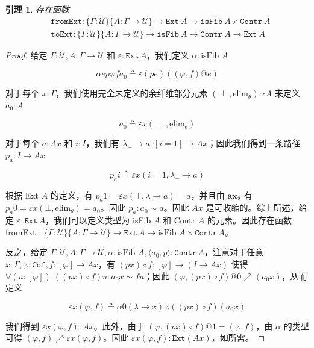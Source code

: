\documentclass{ctexart}
\theoremstyle{plain}
\newtheorem{lemma}[theorem]{引理}
\theoremstyle{definition}
\theoremstyle{definition}
\theoremstyle{definition}
\theoremstyle{definition}
\newcommand{\ax}[1]{\mathbf{ax_{#1}}}
\numberwithin{equation}{section}
\begin{document}
\begin{lemma}
存在函数
\begin{align}
&\mathtt{fromExt} : \{\Gamma : \mathcal{U}\}\{A : \Gamma \to \mathcal{U}\} \to \mathtt{Ext}\ A \to \mathtt{isFib}\ A \times \mathtt{Contr}\ A \\
&\mathtt{toExt} : \{\Gamma : \mathcal{U}\}\{A : \Gamma \to \mathcal{U}\} \to \mathtt{isFib}\ A \to \mathtt{Contr}\ A \to \mathtt{Ext}\ A
\end{align}
\end{lemma}

\begin{proof}
  给定 $ \Gamma : \mathcal{U}, A : \Gamma \to \mathcal{U} $ 和 $ \varepsilon : \mathtt{Ext}\,A $，我们定义 $ \alpha : \text{isFib } A $

\[ \alpha e p \varphi f a_0 \triangleq \varepsilon (p \bar{e}) ((\varphi, f) @ \bar{e}) \]

对于每个 $ x : \Gamma $，我们使用完全未定义的余纤维部分元素 $ (\perp, \text{elim}_\theta) : \square A $ 来定义 $ a_0 : A $

\[ a_0 \triangleq \varepsilon x (\perp, \text{elim}_\theta) \]

对于每个 $ a : A x $ 和 $ i : I $，我们有 $ \lambda_- \to a : [i = 1] \to A x $；因此我们得到一条路径 $ p_a : I \to A x $

\[ p_a i \triangleq \varepsilon x (i = 1, \lambda_- \to a) \]

根据 Ext $ A $ 的定义，有 $ p_a 1 = \varepsilon x(\top, \lambda \to a) = a $，并且由 $ \ax{2} $ 有 $ p_a 0 = \varepsilon x(\bot, \text{elim}_\theta) = a_0 $。因此 $ p_a : a_0 \sim a $。因此 $ A x $ 是可收缩的。综上所述，给定 $ \varepsilon : \mathtt{Ext}\,A $，我们可以定义类型为 isFib $ A $ 和 Contr $ A $ 的元素。因此存在函数 fromExt : $\{\Gamma : \mathcal{U}\} \{A : \Gamma \to \mathcal{U}\} \to \mathtt{Ext}\,A \to \text{isFib } A \times \mathtt{Contr}\,A$。

反之，给定 $ \Gamma : \mathcal{U}, A : \Gamma \to \mathcal{U}, \alpha : \text{isFib } A, \langle a_0, p \rangle : \mathtt{Contr}\,A $，注意对于任意 $ x : \Gamma, \varphi : \mathtt{Cof}, f : [\varphi] \to A x $，有 $ (p x) \circ f : [\varphi] \to (I \to A x) $ 使得 $ \forall (u : [\varphi]). ((p x) \circ f) u : a_0 x \sim f u $；因此 $ (\varphi, (p x) \circ f) @ 0 \nearrow (a_0 x) $，从而定义

\[ \varepsilon x (\varphi, f) \triangleq \alpha 0 (\lambda \to x) \varphi ((p x) \circ f) (a_0 x) \]

我们得到 $ \varepsilon x (\varphi, f) : A x $。此外，由于 $ (\varphi, (p x) \circ f) @ 1 = (\varphi, f) $，由 $ \alpha $ 的类型可得 $ (\varphi, f) \nearrow \varepsilon x (\varphi, f) $。因此 $ \varepsilon x (\varphi, f) : \mathtt{Ext}(A x) $，如所需。
\end{proof}
\end{document}
